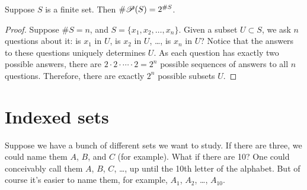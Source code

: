 \documentclass{tufte-book}
\begin{document}
\begin{proposition}
  Suppose $S$ is a finite set. Then $\# \mathscr{P}(S) = 2^{\# S}$.
\end{proposition}

\begin{proof}
  Suppose $\# S = n$, and $S = \{x_1, x_2, \dots, x_n\}$. Given a subset $U \subset S$, we ask $n$ questions about it: is $x_1$ in $U$, is $x_2$ in $U$, \dots, is $x_n$ in $U$? Notice that the answers to these questions uniquely determines $U$. As each question has exactly two possible answers, there are $2 \cdot 2 \cdot \cdots \cdot 2 = 2^n$ possible sequences of answers to all $n$ questions. Therefore, there are exactly $2^n$ possible subsets $U$.
\end{proof}


\section{Indexed sets}
\label{sec:indexed-sets}

Suppose we have a bunch of different sets we want to study. If there are three, we could name them $A$, $B$, and $C$ (for example). What if there are 10? One could conceivably call them $A$, $B$, $C$, \dots, up until the 10th letter of the alphabet. But of course it's easier to name them, for example, $A_1$, $A_2$, \dots, $A_{10}$. 




\end{document}
